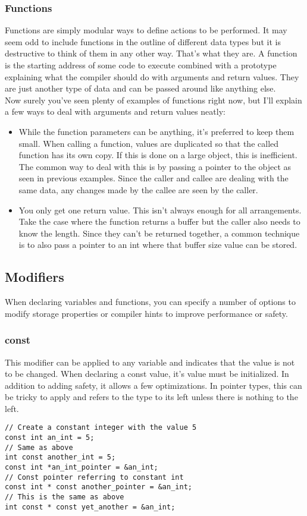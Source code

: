 \documentclass[10pt]{article}
\begin{document}
\subsubsection{Functions}

Functions are simply modular ways to define actions to be performed. It may seem odd to include functions in the outline of different data types but it is destructive to think of them in any other way. That's what they are. A function is the starting address of some code to execute combined with a prototype explaining what the compiler should do with arguments and return values. They are just another type of data and can be passed around like anything else. \\
Now surely you've seen plenty of examples of functions right now, but I'll explain a few ways to deal with arguments and return values neatly:
\begin{itemize}
\item
While the function parameters can be anything, it's preferred to keep them small. When calling a function, values are duplicated so that the called function has its own copy. If this is done on a large object, this is inefficient. The common way to deal with this is by passing a pointer to the object as seen in previous examples. Since the caller and callee are dealing with the same data, any changes made by the callee are seen by the caller.
\item
You only get one return value. This isn't always enough for all arrangements. Take the case where the function returns a buffer but the caller also needs to know the length. Since they can't be returned together, a common technique is to also pass a pointer to an int where that buffer size value can be stored.
\end{itemize}

\subsection{Modifiers}

When declaring variables and functions, you can specify a number of options to modify storage properties or compiler hints to improve performance or safety.

\subsubsection*{const}\label{sec:const}

This modifier can be applied to any variable and indicates that the value is not to be changed. When declaring a const value, it’s value must be initialized. In addition to adding safety, it allows a few optimizations. In pointer types, this can be tricky to apply and refers to the type to its left unless there is nothing to the left.
\begin{lstlisting}[label=lst-const,caption=Constant declarations]
// Create a constant integer with the value 5
const int an_int = 5;
// Same as above
int const another_int = 5;
const int *an_int_pointer = &an_int;
// Const pointer referring to constant int
const int * const another_pointer = &an_int;
// This is the same as above
int const * const yet_another = &an_int;
\end{lstlisting}
\end{document}
